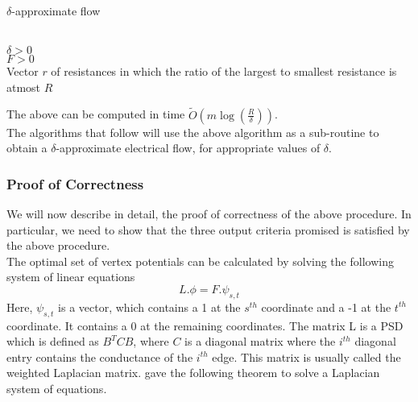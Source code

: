 \documentclass[BTech]{iitmdiss}
\begin{document}
	  \begin{algorithm}[H]
	   \caption{$\delta$-approximate flow}
	   \KwIn
	      {\\
	      $\delta>0$\\
	      $F>0$ \\
	      Vector $r$ of resistances in which the ratio of the largest to smallest resistance is atmost $R$ \\
	      }
	    
	  \end{algorithm}

	    The above can be computed in time $\widetilde{O}(m \log(\frac{R}{\delta}))$. \\
	   
	  
	The algorithms that follow will use the above algorithm as a sub-routine to obtain a $\delta$-approximate electrical flow, for appropriate
	values of $\delta$.
	  
	  \subsubsection{Proof of Correctness}
	    We will now describe in detail, the proof of correctness of the above procedure. In particular, we need to show that the three output
	    criteria promised is satisfied by the above procedure.\\
	    
	    The optimal set of vertex potentials can be calculated by solving the following system of linear equations
	    $$L.\phi = F.\psi_{s,t}$$
	    Here, $\psi_{s,t}$ is a vector, which contains a 1 at the $s^{th}$ coordinate and a -1 at the $t^{th}$ coordinate. It contains a 0 at the 
	    remaining coordinates. The matrix L is a PSD which is defined as $B^T C B$, where $C$ is a diagonal matrix where the $i^{th}$ diagonal 
	    entry contains the conductance of the $i^{th}$ edge. This matrix is usually called the weighted Laplacian matrix. \cite{DBLP:journals/corr/abs-1003-2958}
	    gave the following theorem to solve a Laplacian system of equations.
	    
\end{document}
